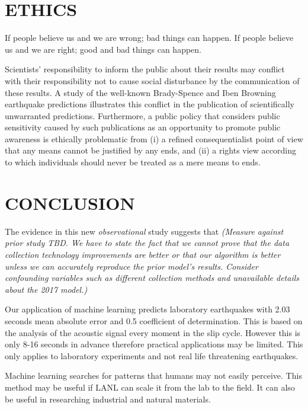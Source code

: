 \documentclass[]{llncs}
\begin{document}
\section{ETHICS}
If people believe us and we are wrong; bad things can happen. If people believe us and we are right; good and bad things can happen.\par

Scientists’ responsibility to inform the public about their results may conflict with their responsibility not to cause social disturbance by the communication of these results. A study of the well-known Brady-Spence and Iben Browning earthquake predictions illustrates this conflict in the publication of scientifically unwarranted predictions. Furthermore, a public policy that considers public sensitivity caused by such publications as an opportunity to promote public awareness is ethically problematic from (i) a refined consequentialist point of view that any means cannot be justified by any ends, and (ii) a rights view according to which individuals should never be treated as a mere means to ends\cite{Ayhan}.
\section{CONCLUSION}
The evidence in this new {\em observational} study suggests that {\em (Measure against prior study TBD. We have to state the fact that we cannot prove that the data collection technology improvements are better or that our algorithm is better unless we can accurately reproduce the prior model's results. Consider confounding variables such as different collection methods and unavailable details about the 2017 model.)}\par
Our application of machine learning predicts laboratory earthquakes with 2.03 seconds mean absolute error and 0.5 coefficient of determination. This is based on the analysis of the acoustic signal every moment in the slip cycle. However this is only 8-16 seconds in advance therefore practical applications may be limited. This only applies to laboratory experiments and not real life threatening earthquakes.\par
Machine learning searches for patterns that humans may not easily perceive. This method may be useful if LANL can scale it from the lab to the field. It can also be useful in researching industrial and natural materials.
\par



\end{document}
